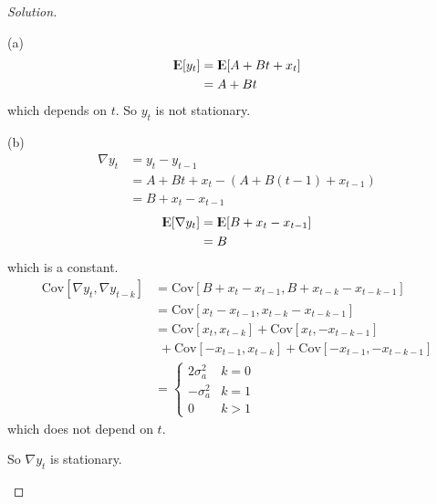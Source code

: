 \documentclass[UTF8,a4paper,14pt]{ctexart}
\newcommand{\E}{{\rm I\kern-.3em E}}
\newcommand{\Cov}{\mathrm{Cov}}
\newenvironment{solution}
  {\renewcommand\qedsymbol{$\blacksquare$}\begin{proof}[Solution]}
  {\end{proof}}
\theoremstyle{definition}
\theoremstyle{remark}
\begin{document}
\begin{solution}
  \,
  \begin{mybox}{(a)}
    \begin{equation*}
      \begin{aligned}
        \E[y_t] 
        &=\E[A+Bt+x_t]\\
        &=A+Bt
      \end{aligned}
    \end{equation*}
    which depends on \(t\). So \(y_t\) is not stationary.
  \end{mybox}

  \begin{mybox}{(b)}
    \begin{equation*}
      \begin{aligned}
        \nabla y_t
        &=y_t - y_{t-1}\\
        &=A+Bt+x_t - (A+B(t-1)+x_{t-1})\\
        &=B+x_t-x_{t-1}
      \end{aligned}
    \end{equation*}
    \begin{equation*}
      \begin{aligned}
        \E[\nabla y_t] 
        &=\E[B+x_t-x_{t-1}]\\
        &=B
      \end{aligned}
    \end{equation*}
    which is a constant.
    \begin{equation*}
      \begin{aligned}
        \Cov[\nabla y_t,\nabla y_{t-k}] 
        &=\Cov[B+x_t-x_{t-1},B+x_{t-k}-x_{t-k-1}]\\
        &=\Cov[x_t-x_{t-1},x_{t-k}-x_{t-k-1}]\\
        &=\Cov[x_t,x_{t-k}]
        +\Cov[x_t,-x_{t-k-1}]\\
        &\,\,+\Cov[-x_{t-1},x_{t-k}]
        +\Cov[-x_{t-1},-x_{t-k-1}]\\
        &=\begin{cases}
          2\sigma_a^2 & k=0\\
          -\sigma_a^2 & k=1\\
          0 &k>1
        \end{cases}
      \end{aligned}
    \end{equation*}
    which does not depend on \(t\). 
    
    
    So \(\nabla y_t\) is stationary.
  \end{mybox}


\end{solution}
\end{document}
